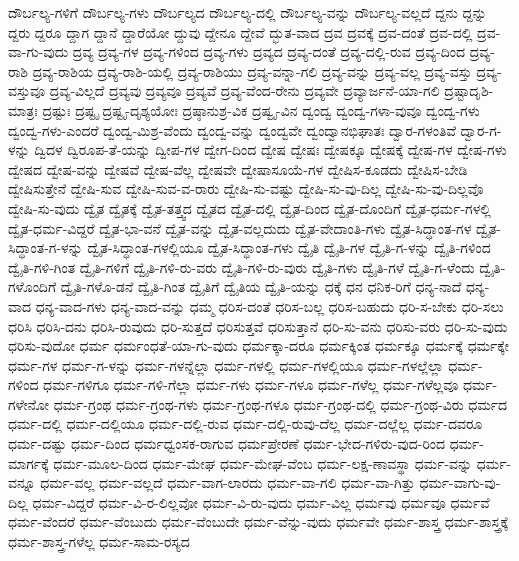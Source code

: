 {ದೌರ್ಬಲ್ಯ-ಗಳಿಗೆ
ದೌರ್ಬಲ್ಯ-ಗಳು
ದೌರ್ಬಲ್ಯದ
ದೌರ್ಬಲ್ಯ-ದಲ್ಲಿ
ದೌರ್ಬಲ್ಯ-ವನ್ನು
ದೌರ್ಬಲ್ಯ-ವಲ್ಲದೆ
ದ್ದನು
ದ್ದನ್ನು
ದ್ದರು
ದ್ದರೂ
ದ್ದಾಗ
ದ್ದಾನೆ
ದ್ದಾರೆಯೋ
ದ್ದುವು
ದ್ದೇನೂ
ದ್ದೇವೆ
ದ್ಭುತ-ವಾದ
ದ್ರವ
ದ್ರವಕ್ಕೆ
ದ್ರವ-ದಂತೆ
ದ್ರವ-ದಲ್ಲಿ
ದ್ರವ-ವಾ-ಗು-ವುದು
ದ್ರವ್ಯ
ದ್ರವ್ಯ-ಗಳ
ದ್ರವ್ಯ-ಗಳಿಂದ
ದ್ರವ್ಯ-ಗಳು
ದ್ರವ್ಯದ
ದ್ರವ್ಯ-ದಂತೆ
ದ್ರವ್ಯ-ದಲ್ಲಿ-ರುವ
ದ್ರವ್ಯ-ದಿಂದ
ದ್ರವ್ಯ-ರಾಶಿ
ದ್ರವ್ಯ-ರಾಶಿಯ
ದ್ರವ್ಯ-ರಾಶಿ-ಯಲ್ಲಿ
ದ್ರವ್ಯ-ರಾಶಿಯು
ದ್ರವ್ಯ-ವನ್ನಾ-ಗಲಿ
ದ್ರವ್ಯ-ವನ್ನು
ದ್ರವ್ಯ-ವಲ್ಲ
ದ್ರವ್ಯ-ವಸ್ತು
ದ್ರವ್ಯ-ವಸ್ತುವೂ
ದ್ರವ್ಯ-ವಿಲ್ಲದೆ
ದ್ರವ್ಯವು
ದ್ರವ್ಯವೂ
ದ್ರವ್ಯವೆ
ದ್ರವ್ಯ-ವೆಂದ-ರೇನು
ದ್ರವ್ಯವೇ
ದ್ರವ್ಯಾರ್ಜನೆ-ಯಾ-ಗಲಿ
ದ್ರಷ್ಟಾದೃಶಿ-ಮಾತ್ರಃ
ದ್ರಷ್ಟುಃ
ದ್ರಷ್ಟೃ
ದ್ರಷ್ಟೃ-ದೃಶ್ಯಯೋಃ
ದ್ರಷ್ಠಾನುಶ್ರ-ವಿಕ
ದ್ರಷ್ವೃ-ವಿನ
ದ್ವಂದ್ವ
ದ್ವಂದ್ವ-ಗಳಾ-ವುವೂ
ದ್ವಂದ್ವ-ಗಳು
ದ್ವಂದ್ವ-ಗಳು-ಎಂದರೆ
ದ್ವಂದ್ವ-ಮಿಶ್ರ-ವೆಂದು
ದ್ವಂದ್ವ-ವನ್ನು
ದ್ವಂದ್ವವೇ
ದ್ವಂದ್ವಾನಭಿಘಾತಃ
ದ್ವಾರ-ಗಳಂತಿವೆ
ದ್ವಾರ-ಗ-ಳನ್ನು
ದ್ವಿದಳ
ದ್ವಿರೂಪ-ತೆ-ಯನ್ನು
ದ್ವೀಪ-ಗಳ
ದ್ವೇಗ-ದಿಂದ
ದ್ವೇಷ
ದ್ವೇಷಃ
ದ್ವೇಷಕ್ಕೂ
ದ್ವೇಷಕ್ಕೆ
ದ್ವೇಷ-ಗಳ
ದ್ವೇಷ-ಗಳು
ದ್ವೇಷದ
ದ್ವೇಷ-ವನ್ನು
ದ್ವೇಷವೆ
ದ್ವೇಷ-ವೆಲ್ಲ
ದ್ವೇಷವೇ
ದ್ವೇಷಾಸೂಯೆ-ಗಳ
ದ್ವೇಷಿಸ-ಕೂಡದು
ದ್ವೇಷಿಸ-ಬೇಡಿ
ದ್ವೇಷಿಸುತ್ತೇನೆ
ದ್ವೇಷಿ-ಸುವ
ದ್ವೇಷಿ-ಸುವ-ವ-ರಾರು
ದ್ವೇಷಿ-ಸು-ವಷ್ಟು
ದ್ವೇಷಿ-ಸು-ವು-ದಿಲ್ಲ
ದ್ವೇಷಿ-ಸು-ವು-ದಿಲ್ಲವೊ
ದ್ವೇಷಿ-ಸು-ವುದು
ದ್ವೈತ
ದ್ವೈತಕ್ಕೆ
ದ್ವೈತ-ತತ್ತ್ವದ
ದ್ವೈತದ
ದ್ವೈತ-ದಲ್ಲಿ
ದ್ವೈತ-ದಿಂದ
ದ್ವೈತ-ದೊಂದಿಗೆ
ದ್ವೈತ-ಧರ್ಮ-ಗಳಲ್ಲಿ
ದ್ವೈತ-ಧರ್ಮ-ವಿದ್ದರೆ
ದ್ವೈತ-ಭಾ-ವನೆ
ದ್ವೈತ-ವನ್ನು
ದ್ವೈತ-ವಲ್ಲದುದು
ದ್ವೈತ-ವೇದಾಂತಿ-ಗಳು
ದ್ವೈತ-ಸಿದ್ಧಾಂತ-ಗಳ
ದ್ವೈತ-ಸಿದ್ಧಾಂತ-ಗ-ಳನ್ನು
ದ್ವೈತ-ಸಿದ್ಧಾಂತ-ಗಳಲ್ಲಿಯೂ
ದ್ವೈತ-ಸಿದ್ಧಾಂತ-ಗಳು
ದ್ವೈತಿ
ದ್ವೈತಿ-ಗಳ
ದ್ವೈತಿ-ಗ-ಳನ್ನು
ದ್ವೈತಿ-ಗಳಿಂದ
ದ್ವೈತಿ-ಗಳಿ-ಗಿಂತ
ದ್ವೈತಿ-ಗಳಿಗೆ
ದ್ವೈತಿ-ಗಳಿ-ರು-ವರು
ದ್ವೈತಿ-ಗಳಿ-ರು-ವುರು
ದ್ವೈತಿ-ಗಳು
ದ್ವೈತಿ-ಗಳೆ
ದ್ವೈತಿ-ಗ-ಳೆಂದು
ದ್ವೈತಿ-ಗಳೊಂದಿಗೆ
ದ್ವೈತಿ-ಗಳೊ-ಡನೆ
ದ್ವೈತಿ-ಗಿಂತ
ದ್ವೈತಿಗೆ
ದ್ವೈತಿಯ
ದ್ವೈತಿ-ಯನ್ನು
ಧಕ್ಕೆ
ಧನ
ಧನಿಕ-ರಿಗೆ
ಧನ್ಯ-ನಾದೆ
ಧನ್ಯ-ವಾದ
ಧನ್ಯ-ವಾದ-ಗಳು
ಧನ್ಯ-ವಾದ-ವನ್ನು
ಧಮ್ಮ
ಧರಿಸ-ದಂತೆ
ಧರಿಸ-ಬಲ್ಲ
ಧರಿಸ-ಬಹುದು
ಧರಿ-ಸ-ಬೇಕು
ಧರಿ-ಸಲು
ಧರಿಸಿ
ಧರಿಸಿ-ದನು
ಧರಿಸಿ-ರುವುದು
ಧರಿ-ಸುತ್ತದೆ
ಧರಿಸುತ್ತವೆ
ಧರಿಸುತ್ತಾನೆ
ಧರಿ-ಸು-ವನು
ಧರಿಸು-ವರು
ಧರಿ-ಸು-ವುದು
ಧರಿಸು-ವುದೋ
ಧರ್ಮ
ಧರ್ಮಂಧತೆ-ಯಾ-ಗು-ವುದು
ಧರ್ಮಕ್ಕಾ-ದರೂ
ಧರ್ಮಕ್ಕಿಂತ
ಧರ್ಮಕ್ಕೂ
ಧರ್ಮಕ್ಕೆ
ಧರ್ಮಕ್ಕೇ
ಧರ್ಮ-ಗಳ
ಧರ್ಮ-ಗ-ಳನ್ನು
ಧರ್ಮ-ಗಳನ್ನೆಲ್ಲಾ
ಧರ್ಮ-ಗಳಲ್ಲಿ
ಧರ್ಮ-ಗಳಲ್ಲಿಯೂ
ಧರ್ಮ-ಗಳಲ್ಲೆಲ್ಲಾ
ಧರ್ಮ-ಗಳಿಂದ
ಧರ್ಮ-ಗಳಿಗೂ
ಧರ್ಮ-ಗಳಿ-ಗೆಲ್ಲಾ
ಧರ್ಮ-ಗಳು
ಧರ್ಮ-ಗಳೂ
ಧರ್ಮ-ಗಳೆಲ್ಲ
ಧರ್ಮ-ಗಳೆಲ್ಲವೂ
ಧರ್ಮ-ಗಳೇನೋ
ಧರ್ಮ-ಗ್ರಂಥ
ಧರ್ಮ-ಗ್ರಂಥ-ಗಳು
ಧರ್ಮ-ಗ್ರಂಥ-ಗಳೂ
ಧರ್ಮ-ಗ್ರಂಥ-ದಲ್ಲಿ
ಧರ್ಮ-ಗ್ರಂಥ-ವಿರು
ಧರ್ಮದ
ಧರ್ಮ-ದಲ್ಲಿ
ಧರ್ಮ-ದಲ್ಲಿಯೂ
ಧರ್ಮ-ದಲ್ಲಿ-ರುವ
ಧರ್ಮ-ದಲ್ಲಿ-ರುವು-ದೆಲ್ಲ
ಧರ್ಮ-ದಲ್ಲೆಲ್ಲ
ಧರ್ಮ-ದವರೂ
ಧರ್ಮ-ದಷ್ಟು
ಧರ್ಮ-ದಿಂದ
ಧರ್ಮಧ್ವಂಸಕ-ರಾಗುವ
ಧರ್ಮಪ್ರೇರಣೆ
ಧರ್ಮ-ಭೇದ-ಗಳಿರು-ವುದ-ರಿಂದ
ಧರ್ಮ-ಮಾರ್ಗಕ್ಕೆ
ಧರ್ಮ-ಮೂಲ-ದಿಂದ
ಧರ್ಮ-ಮೇಘ
ಧರ್ಮ-ಮೇಘ-ವೆಂಬ
ಧರ್ಮ-ಲಕ್ಷ-ಣಾವಸ್ಥಾ
ಧರ್ಮ-ವನ್ನು
ಧರ್ಮ-ವನ್ನೂ
ಧರ್ಮ-ವಲ್ಲ
ಧರ್ಮ-ವಲ್ಲದೆ
ಧರ್ಮ-ವಾಗ-ಲಾರದು
ಧರ್ಮ-ವಾ-ಗಲಿ
ಧರ್ಮ-ವಾ-ಗಿತ್ತು
ಧರ್ಮ-ವಾಗು-ವು-ದಿಲ್ಲ
ಧರ್ಮ-ವಿದ್ದರೆ
ಧರ್ಮ-ವಿ-ರ-ಲಿಲ್ಲವೋ
ಧರ್ಮ-ವಿ-ರು-ವುದು
ಧರ್ಮ-ವಿಲ್ಲ
ಧರ್ಮವು
ಧರ್ಮವೂ
ಧರ್ಮವೆ
ಧರ್ಮ-ವೆಂದರೆ
ಧರ್ಮ-ವೆಂಬುದು
ಧರ್ಮ-ವೆಂಬುದೇ
ಧರ್ಮ-ವೆನ್ನು-ವುದು
ಧರ್ಮವೇ
ಧರ್ಮ-ಶಾಸ್ತ್ರ
ಧರ್ಮ-ಶಾಸ್ತ್ರಕ್ಕೆ
ಧರ್ಮ-ಶಾಸ್ತ್ರ-ಗಳೆಲ್ಲ
ಧರ್ಮ-ಸಾಮ-ರಸ್ಯದ
}
